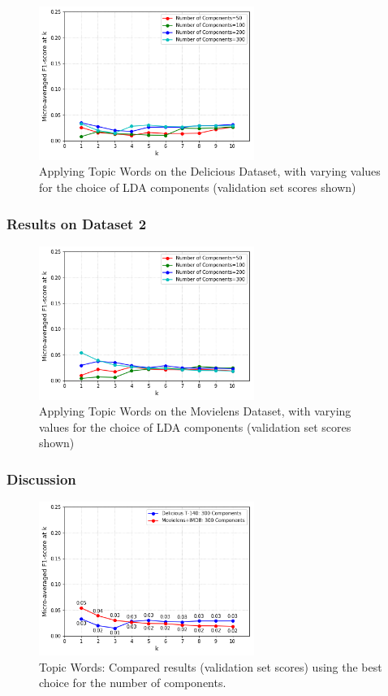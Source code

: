 \begin{figure}[H]
    \centering
    \includegraphics[width=7cm]{chapters/05_experiments/images/delicious-topic-words.png}
    \caption{Applying Topic Words on the Delicious Dataset, with varying values for the choice of LDA components (validation set scores shown)}
    \label{fig:topic_words_delicious}
\end{figure}

\subsubsection{Results on Dataset 2}

\begin{figure}[H]
    \centering
    \includegraphics[width=7cm]{chapters/05_experiments/images/movielens-topic-words.png}
    \caption{Applying Topic Words on the Movielens Dataset, with varying values for the choice of LDA components (validation set scores shown)}
    \label{fig:topic_words_movielens}
\end{figure}

\subsubsection{Discussion}

\begin{figure}[H]
    \centering
    \includegraphics[width=7cm]{chapters/05_experiments/images/proposal-1-compared-topic-words.png}
    \caption{Topic Words: Compared results (validation set scores) using the best choice for the number of components.}
    \label{fig:compared_topic_words}
\end{figure}

